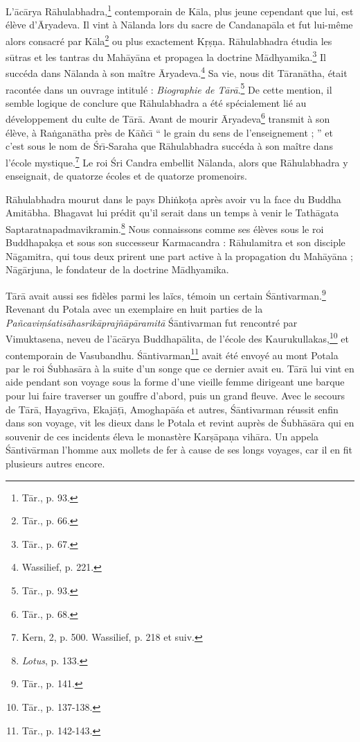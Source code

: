 \documentclass[a4paper, 11pt, oneside, french]{article}
\begin{document}
L'\={a}c\={a}rya R\={a}hulabhadra,\footnote{T\={a}r., p. 93.} contemporain de K\={a}la, plus jeune cependant que lui, est élève d'\={A}ryadeva. Il vint à N\={a}landa lors du sacre de Candanap\={a}la et fut lui-même alors consacré par K\={a}la\footnote{T\={a}r., p. 66.} ou plus exactement K\d{r}\d{s}\d{n}a. R\={a}hulabhadra étudia les s\={u}tras et les tantras du Mah\={a}y\={a}na et propagea la doctrine M\={a}dhyamika.\footnote{T\={a}r., p. 67.} Il succéda dans N\={a}landa à son maître \={A}ryadeva.\footnote{Wassilief, p. 221.} Sa vie, nous dit T\={a}ran\={a}tha, était racontée dans un ouvrage intitulé : \emph{Biographie de T\={a}r\={a}}.\footnote{T\={a}r., p. 93.} De cette mention, il semble logique de conclure que R\={a}hulabhadra a été spécialement lié au développement du culte de T\={a}r\={a}. Avant de mourir \={A}ryadeva\footnote{T\={a}r., p. 68.} transmit à son élève, à Ra\.{n}gan\={a}tha près de K\={a}\~{n}c\={\i} `` le grain du sens de l'enseignement ; '' et c'est sous le nom de \'{S}r\={\i}-Saraha que R\={a}hulabhadra succéda à son maître dans l'école mystique.\footnote{Kern, 2, p. 500. Wassilief, p. 218 et suiv.} Le roi \'{S}ri Candra embellit N\={a}landa, alors que R\={a}hulabhadra y enseignait, de quatorze écoles et de quatorze promenoirs.

R\={a}hulabhadra mourut dans le pays Dhi\.{n}ko\d{t}a après avoir vu la face du Buddha Amit\={a}bha. Bhagavat lui prédit qu'il serait dans un temps à venir le Tath\={a}gata Saptaratnapadmavikramin.\footnote{\emph{Lotus}, p. 133.} Nous connaissons comme ses élèves sous le roi Buddhapak\d{s}a et sous son successeur Karmacandra : R\={a}hulamitra et son disciple N\={a}gamitra, qui tous deux prirent une part active à la propagation du Mah\={a}y\={a}na ; N\={a}g\={a}rjuna, le fondateur de la doctrine M\={a}dhyamika.

T\={a}r\={a} avait aussi ses fidèles parmi les laïcs, témoin un certain \'{S}\={a}ntivarman.\footnote{T\={a}r., p. 141.} Revenant du Potala avec un exemplaire en huit parties de la \emph{Pa\~{n}cavi\d{m}\'{s}atis\={a}hasrik\={a}praj\~{n}\={a}p\={a}ramit\={a}} \'{S}\={a}ntivarman fut rencontré par Vimuktasena, neveu de l'\={a}c\={a}rya Buddhap\={a}lita, de l'école des Kaurukullakas,\footnote{T\={a}r., p. 137-138.} et contemporain de Vasubandhu. \'{S}\={a}ntivarman\footnote{T\={a}r., p. 142-143.} avait été envoyé au mont Potala par le roi \'{S}ubhas\={a}ra à la suite d'un songe que ce dernier avait eu. T\={a}r\={a} lui vint en aide pendant son voyage sous la forme d'une vieille femme dirigeant une barque pour lui faire traverser un gouffre d'abord, puis un grand fleuve. Avec le secours de T\={a}r\={a}, Hayagr\={\i}va, Ekaj\={a}\d{t}\={\i}, Amoghap\={a}\'{s}a et autres, \'{S}\={a}ntivarman réussit enfin dans son voyage, vit les dieux dans le Potala et revint auprès de \'{S}ubh\={a}s\={a}ra qui en souvenir de ces incidents éleva le monastère Kar\d{s}\={a}pa\d{n}a vih\={a}ra. Un appela \'{S}\={a}ntiv\={a}rman l'homme aux mollets de fer à cause de ses longs voyages, car il en fit plusieurs autres encore.
\end{document}
